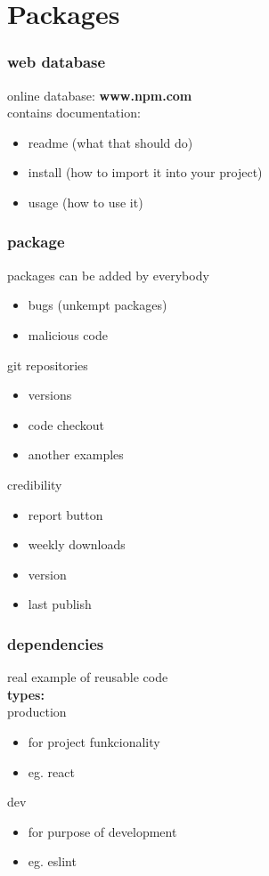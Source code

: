 \documentclass{beamer}
\begin{document}
\section{Packages}

\begin{frame}
\frametitle{web database}
online database:  \textbf{www.npm.com}\\
contains documentation:
\begin{itemize}
\item readme (what that should do)
\item install (how to import it into your project)
\item usage (how to use it)
\end{itemize}
\end{frame}

\begin{frame}
\frametitle{package}
packages can be added by everybody
\begin{itemize}
\item bugs (unkempt packages)
\item malicious code
\end{itemize}
git repositories
\begin{itemize}
\item versions
\item code checkout
\item another examples
\end{itemize}
credibility
\begin{itemize}
\item report button
\item weekly downloads
\item version
\item last publish
\end{itemize}
\end{frame}

\begin{frame}
\frametitle{dependencies}
real example of reusable code \\
\textbf{types:}\\
production
\begin{itemize}
\item for project funkcionality
\item eg. react
\end{itemize}
dev
\begin{itemize}
\item for purpose of development
\item eg. eslint
\end{itemize}
\end{frame}
\end{document}
